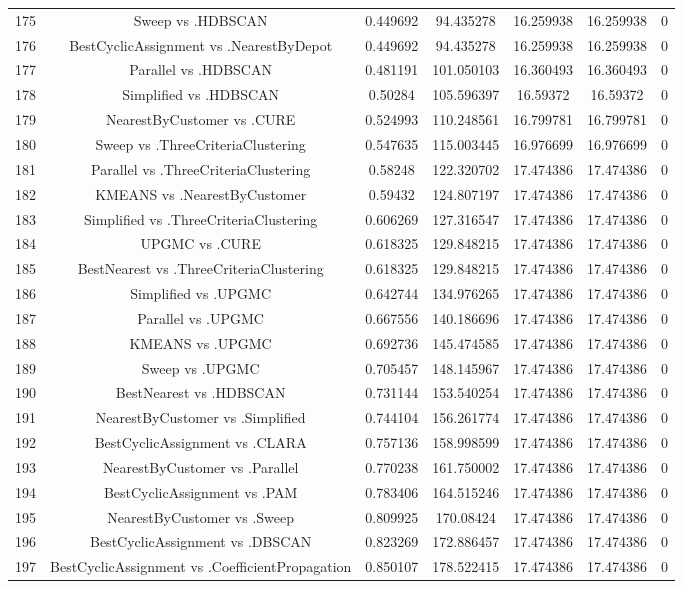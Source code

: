 \documentclass[a4paper,10pt]{article}
\begin{document}
\begin{landscape}
\begin{table}[!htp]
\begin{tabular}{ccccccc}
175&Sweep vs .HDBSCAN&0.449692&94.435278&16.259938&16.259938&0\\
176&BestCyclicAssignment vs .NearestByDepot&0.449692&94.435278&16.259938&16.259938&0\\
177&Parallel vs .HDBSCAN&0.481191&101.050103&16.360493&16.360493&0\\
178&Simplified vs .HDBSCAN&0.50284&105.596397&16.59372&16.59372&0\\
179&NearestByCustomer vs .CURE&0.524993&110.248561&16.799781&16.799781&0\\
180&Sweep vs .ThreeCriteriaClustering&0.547635&115.003445&16.976699&16.976699&0\\
181&Parallel vs .ThreeCriteriaClustering&0.58248&122.320702&17.474386&17.474386&0\\
182&KMEANS vs .NearestByCustomer&0.59432&124.807197&17.474386&17.474386&0\\
183&Simplified vs .ThreeCriteriaClustering&0.606269&127.316547&17.474386&17.474386&0\\
184&UPGMC vs .CURE&0.618325&129.848215&17.474386&17.474386&0\\
185&BestNearest vs .ThreeCriteriaClustering&0.618325&129.848215&17.474386&17.474386&0\\
186&Simplified vs .UPGMC&0.642744&134.976265&17.474386&17.474386&0\\
187&Parallel vs .UPGMC&0.667556&140.186696&17.474386&17.474386&0\\
188&KMEANS vs .UPGMC&0.692736&145.474585&17.474386&17.474386&0\\
189&Sweep vs .UPGMC&0.705457&148.145967&17.474386&17.474386&0\\
190&BestNearest vs .HDBSCAN&0.731144&153.540254&17.474386&17.474386&0\\
191&NearestByCustomer vs .Simplified&0.744104&156.261774&17.474386&17.474386&0\\
192&BestCyclicAssignment vs .CLARA&0.757136&158.998599&17.474386&17.474386&0\\
193&NearestByCustomer vs .Parallel&0.770238&161.750002&17.474386&17.474386&0\\
194&BestCyclicAssignment vs .PAM&0.783406&164.515246&17.474386&17.474386&0\\
195&NearestByCustomer vs .Sweep&0.809925&170.08424&17.474386&17.474386&0\\
196&BestCyclicAssignment vs .DBSCAN&0.823269&172.886457&17.474386&17.474386&0\\
197&BestCyclicAssignment vs .CoefficientPropagation&0.850107&178.522415&17.474386&17.474386&0\\

\end{tabular}
\end{table}
\end{landscape}
\end{document}
